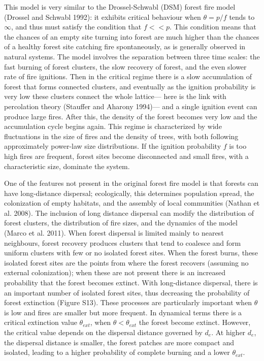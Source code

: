 \documentclass[
]{article}
\begin{document}
This model is very similar to the Drossel-Schwabl (DSM) forest fire
model (Drossel and Schwabl 1992): it exhibits critical behaviour when
\(\theta = p/f\) tends to \(\infty\), and thus must satisfy the
condition that \(f << p\). This condition means that the chances of an
empty site turning into forest are much higher than the chances of a
healthy forest site catching fire spontaneously, as is generally
observed in natural systems. The model involves the separation between
three time scales: the fast burning of forest clusters, the slow
recovery of forest, and the even slower rate of fire ignitions. Then in
the critical regime there is a slow accumulation of forest that forms
connected clusters, and eventually as the ignition probability is very
low these clusters connect the whole lattice--- here is the link with
percolation theory (Stauffer and Aharony 1994)--- and a single ignition
event can produce large fires. After this, the density of the forest
becomes very low and the accumulation cycle begins again. This regime is
characterized by wide fluctuations in the size of fires and the density
of trees, with both following approximately power-law size
distributions. If the ignition probability \(f\) is too high fires are
frequent, forest sites become disconnected and small fires, with a
characteristic size, dominate the system.

One of the features not present in the original forest fire model is
that forests can have long-distance dispersal; ecologically, this
determines population spread, the colonization of empty habitats, and
the assembly of local communities (Nathan et al. 2008). The inclusion of
long distance dispersal can modify the distribution of forest clusters,
the distribution of fire sizes, and the dynamics of the model (Marco et
al. 2011). When forest dispersal is limited mainly to nearest
neighbours, forest recovery produces clusters that tend to coalesce and
form uniform clusters with few or no isolated forest sites. When the
forest burns, these isolated forest sites are the points from where the
forest recovers (assuming no external colonization); when these are not
present there is an increased probability that the forest becomes
extinct. With long-distance dispersal, there is an important number of
isolated forest sites, thus decreasing the probability of forest
extinction (Figure S13). These processes are particularly important when
\(\theta\) is low and fires are smaller but more frequent. In dynamical
terms there is a critical extinction value \(\theta_{ext}\), when
\(\theta < \theta_{ext}\) the forest become extinct. However, the
critical value depends on the dispersal distance governed by \(d_e\). At
higher \(d_e\), the dispersal distance is smaller, the forest patches
are more compact and isolated, leading to a higher probability of
complete burning and a lower \(\theta_{ext}\).
\end{document}

